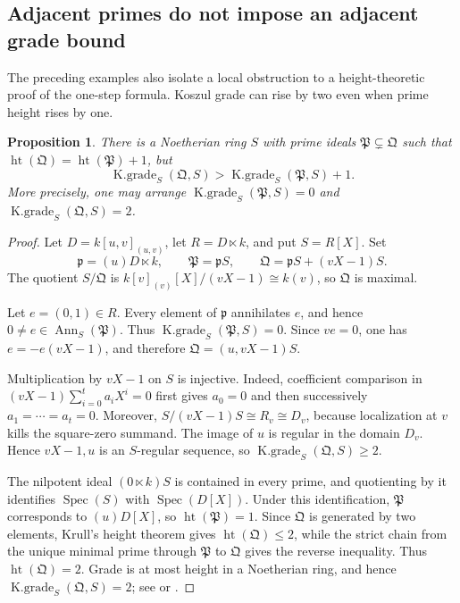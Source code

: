 \documentclass[11pt]{amsart}
\numberwithin{equation}{section}
\newtheorem{proposition}[theorem]{Proposition}
\theoremstyle{definition}
\theoremstyle{remark}
\newcommand{\Spec}{\operatorname{Spec}}
\newcommand{\Ann}{\operatorname{Ann}}
\newcommand{\htp}{\operatorname{ht}}
\newcommand{\Kgr}{\operatorname{K.grade}}
\begin{document}
\subsection{Adjacent primes do not impose an adjacent grade bound}

The preceding examples also isolate a local obstruction to a height-theoretic proof of the one-step formula.  Koszul grade can rise by two even when prime height rises by one.

\begin{proposition}\label{prop:adjacent-grade}
There is a Noetherian ring $S$ with prime ideals $\mathfrak P\subsetneq\mathfrak Q$ such that $\htp(\mathfrak Q)=\htp(\mathfrak P)+1$, but
\[
 \Kgr_S(\mathfrak Q,S)>\Kgr_S(\mathfrak P,S)+1.
\]
More precisely, one may arrange $\Kgr_S(\mathfrak P,S)=0$ and $\Kgr_S(\mathfrak Q,S)=2$.
\end{proposition}

\begin{proof}
Let $D=k[u,v]_{(u,v)}$, let $R=D\ltimes k$, and put $S=R[X]$.  Set
\[
 \mathfrak p=(u)D\ltimes k,
 \qquad
 \mathfrak P=\mathfrak pS,
 \qquad
 \mathfrak Q=\mathfrak pS+(vX-1)S.
\]
The quotient $S/\mathfrak Q$ is $k[v]_{(v)}[X]/(vX-1)\cong k(v)$, so $\mathfrak Q$ is maximal.

Let $e=(0,1)\in R$.  Every element of $\mathfrak p$ annihilates $e$, and hence $0\neq e\in\Ann_S(\mathfrak P)$.  Thus $\Kgr_S(\mathfrak P,S)=0$.  Since $ve=0$, one has $e=-e(vX-1)$, and therefore $\mathfrak Q=(u,vX-1)S$.

Multiplication by $vX-1$ on $S$ is injective.  Indeed, coefficient comparison in $(vX-1)\sum_{i=0}^t a_iX^i=0$ first gives $a_0=0$ and then successively $a_1=\cdots=a_t=0$.  Moreover, $S/(vX-1)S\cong R_v\cong D_v$, because localization at $v$ kills the square-zero summand.  The image of $u$ is regular in the domain $D_v$.  Hence $vX-1,u$ is an $S$-regular sequence, so $\Kgr_S(\mathfrak Q,S)\geq2$.

The nilpotent ideal $(0\ltimes k)S$ is contained in every prime, and quotienting by it identifies $\Spec(S)$ with $\Spec(D[X])$.  Under this identification, $\mathfrak P$ corresponds to $(u)D[X]$, so $\htp(\mathfrak P)=1$.  Since $\mathfrak Q$ is generated by two elements, Krull's height theorem gives $\htp(\mathfrak Q)\leq2$, while the strict chain from the unique minimal prime through $\mathfrak P$ to $\mathfrak Q$ gives the reverse inequality.  Thus $\htp(\mathfrak Q)=2$.  Grade is at most height in a Noetherian ring, and hence $\Kgr_S(\mathfrak Q,S)=2$; see \cite[Chapter~1]{BrunsHerzog} or \cite[Chapter~13]{Matsumura}.
\end{proof}
\end{document}
